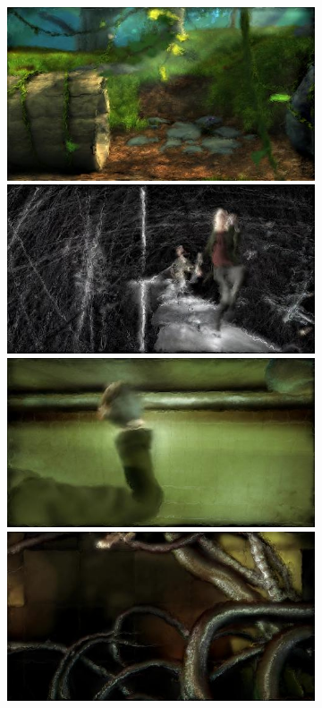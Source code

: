 \begin{figure}
\begin{subfigure}[t]{0.135\textwidth}
		\includegraphics[width=\textwidth]{figures/stereo/bbb_frame-0353-12}\\
		\includegraphics[width=\textwidth]{figures/stereo/ed_frame-0097-12}\\
		\includegraphics[width=\textwidth]{figures/stereo/ed_frame-0438-12}\\
		\includegraphics[width=\textwidth]{figures/stereo/ed_frame-0528-12}

\end{subfigure}
\end{figure}
